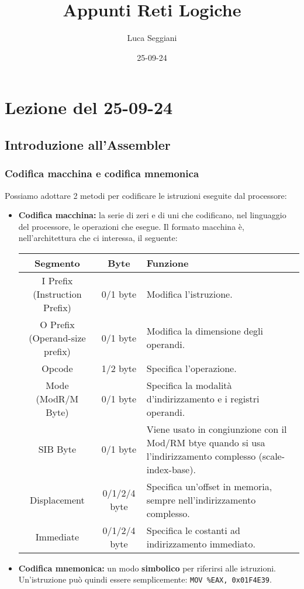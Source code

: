 \documentclass[a4paper,11pt]{article}
\title{Appunti Reti Logiche}
\author{Luca Seggiani}
\date{25-09-24}
\begin{document}
\section{Lezione del 25-09-24}

\thispagestyle{empty}
\pagestyle{fancy}

\subsection{Introduzione all'Assembler}

\subsubsection{Codifica macchina e codifica mnemonica}
Possiamo adottare 2 metodi per codificare le istruzioni eseguite dal processore:

\begin{itemize}
	\item \textbf{Codifica macchina:} la serie di zeri e di uni che codificano, nel linguaggio del processore, le operazioni che esegue.
		Il formato macchina è, nell'architettura che ci interessa, il seguente:

		\begin{table}[h!]
			\center {}
			\begin{tabular} { c | c | p{7cm} }
				\bfseries Segmento & \bfseries Byte & \bfseries Funzione \\
				\hline 
				I Prefix (Instruction Prefix) & 0/1 byte & Modifica l'istruzione. \\ 
				O Prefix (Operand-size prefix) & 0/1 byte & Modifica la dimensione degli operandi. \\
				Opcode & 1/2 byte & Specifica l'operazione. \\
				Mode (ModR/M Byte) & 0/1 byte & Specifica la modalità d'indirizzamento e i registri operandi. \\ 
				SIB Byte & 0/1 byte & Viene usato in congiunzione con il Mod/RM btye quando si usa l'indirizzamento complesso (scale-index-base). \\
				Displacement & 0/1/2/4 byte & Specifica un'offset in memoria, sempre nell'indirizzamento complesso. \\
				Immediate & 0/1/2/4 byte & Specifica le costanti ad indirizzamento immediato.
			\end{tabular}
		\end{table}

	\item \textbf{Codifica mnemonica:} un modo \textbf{simbolico} per riferirsi alle istruzioni.
		Un'istruzione può quindi essere semplicemente: \lstinline|MOV %EAX, 0x01F4E39|.
\end{itemize}
\end{document}
